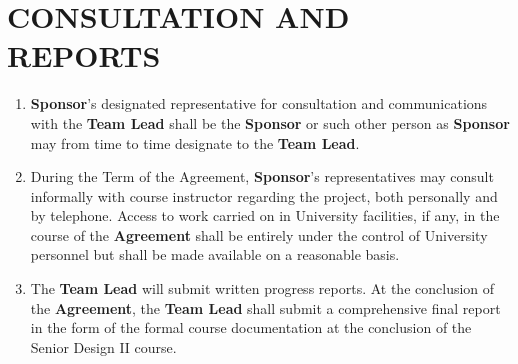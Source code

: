 \documentclass[11pt]{article}
\begin{document}
\section{CONSULTATION AND REPORTS}     
\begin{enumerate}  \itemsep4pt \parskip0pt 
\item  \textbf{Sponsor}'s designated representative for consultation and       communications with the \textbf{Team Lead} shall be the \textbf{Sponsor}   or such other person as \textbf{Sponsor}       may from time to time designate to the \textbf{Team Lead}.    

\item During the Term of the Agreement, \textbf{Sponsor}'s representatives may       consult informally with course instructor regarding the       project, both personally and by telephone. Access to work carried       on in University facilities, if any, in the course of the \textbf{Agreement} shall       be entirely under the control of University personnel but shall be       made available on a reasonable basis.    

\item The \textbf{Team Lead} will submit written progress reports. At the conclusion of the \textbf{Agreement}, the \textbf{Team Lead} shall submit a comprehensive final report in the form of the formal course documentation at the conclusion of the Senior Design II course. 
\end{enumerate}
\end{document}
